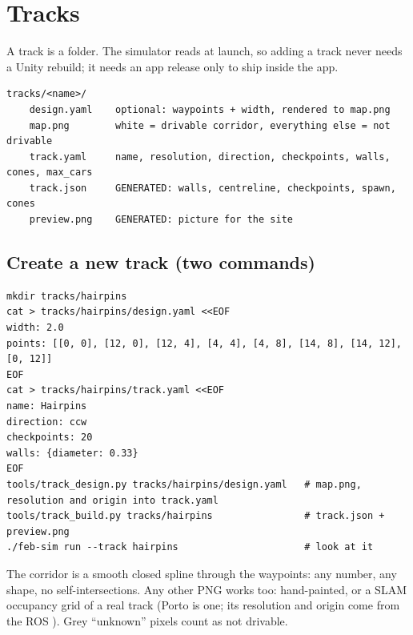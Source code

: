\documentclass[11pt,a4paper]{article}
\begin{document}
\section{Tracks}

A track is a folder. The simulator reads  at launch, so adding a track never
needs a Unity rebuild; it needs an app release only to ship inside the app.

\begin{lstlisting}
tracks/<name>/
    design.yaml    optional: waypoints + width, rendered to map.png
    map.png        white = drivable corridor, everything else = not drivable
    track.yaml     name, resolution, direction, checkpoints, walls, cones, max_cars
    track.json     GENERATED: walls, centreline, checkpoints, spawn, cones
    preview.png    GENERATED: picture for the site
\end{lstlisting}

\subsection{Create a new track (two commands)}

\begin{lstlisting}
mkdir tracks/hairpins
cat > tracks/hairpins/design.yaml <<EOF
width: 2.0
points: [[0, 0], [12, 0], [12, 4], [4, 4], [4, 8], [14, 8], [14, 12], [0, 12]]
EOF
cat > tracks/hairpins/track.yaml <<EOF
name: Hairpins
direction: ccw
checkpoints: 20
walls: {diameter: 0.33}
EOF
tools/track_design.py tracks/hairpins/design.yaml   # map.png, resolution and origin into track.yaml
tools/track_build.py tracks/hairpins                # track.json + preview.png
./feb-sim run --track hairpins                      # look at it
\end{lstlisting}

The corridor is a smooth closed spline through the waypoints: any number, any shape, no
self-intersections. Any other PNG works too: hand-painted, or a SLAM occupancy grid of a real
track (Porto is one; its resolution and origin come from the ROS ). Grey
``unknown'' pixels count as not drivable.
\end{document}
